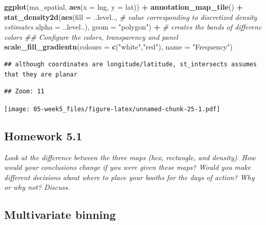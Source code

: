 \documentclass[]{book}
\newenvironment{Shaded}{\begin{snugshade}}{\end{snugshade}}
\newcommand{\CommentTok}[1]{\textcolor[rgb]{0.56,0.35,0.01}{\textit{#1}}}
\newcommand{\DataTypeTok}[1]{\textcolor[rgb]{0.13,0.29,0.53}{#1}}
\newcommand{\KeywordTok}[1]{\textcolor[rgb]{0.13,0.29,0.53}{\textbf{#1}}}
\newcommand{\NormalTok}[1]{#1}
\newcommand{\OperatorTok}[1]{\textcolor[rgb]{0.81,0.36,0.00}{\textbf{#1}}}
\newcommand{\StringTok}[1]{\textcolor[rgb]{0.31,0.60,0.02}{#1}}
\begin{document}
\begin{Shaded}
\begin{Highlighting}[]
\KeywordTok{ggplot}\NormalTok{(ma_spatial, }\KeywordTok{aes}\NormalTok{(}\DataTypeTok{x =}\NormalTok{ lng, }\DataTypeTok{y =}\NormalTok{ lat)) }\OperatorTok{+}\StringTok{ }
\StringTok{  }\KeywordTok{annotation_map_tile}\NormalTok{() }\OperatorTok{+}\StringTok{ }
\StringTok{  }\KeywordTok{stat_density2d}\NormalTok{(}\KeywordTok{aes}\NormalTok{(}\DataTypeTok{fill =}\NormalTok{ ..level.., }\CommentTok{# value corresponding to discretized density estimates }
                     \DataTypeTok{alpha =}\NormalTok{ ..level..), }
                 \DataTypeTok{geom =} \StringTok{"polygon"}\NormalTok{) }\OperatorTok{+}\StringTok{  }\CommentTok{# creates the bands of differenc colors}
\StringTok{  }\CommentTok{## Configure the colors, transparency and panel}
\StringTok{  }\KeywordTok{scale_fill_gradientn}\NormalTok{(}\DataTypeTok{colours =} \KeywordTok{c}\NormalTok{(}\StringTok{"white"}\NormalTok{,}\StringTok{"red"}\NormalTok{), }
                       \DataTypeTok{name =} \StringTok{"Frequency"}\NormalTok{) }
\end{Highlighting}
\end{Shaded}

\begin{verbatim}
## although coordinates are longitude/latitude, st_intersects assumes that they are planar
\end{verbatim}

\begin{verbatim}
## Zoom: 11
\end{verbatim}

\texttt{[image: 05-week5\_files/figure-latex/unnamed-chunk-25-1.pdf]}

\hypertarget{homework-5.1}{%
\subsection{Homework 5.1}\label{homework-5.1}}

\emph{Look at the difference between the three maps (hex, rectangle, and density). How would your conclusions change if you were given these maps? Would you make different decisions about where to place your booths for the days of action? Why or why not? Discuss.}

\hypertarget{multivariate-binning}{%
\subsection{Multivariate binning}\label{multivariate-binning}}
\end{document}
